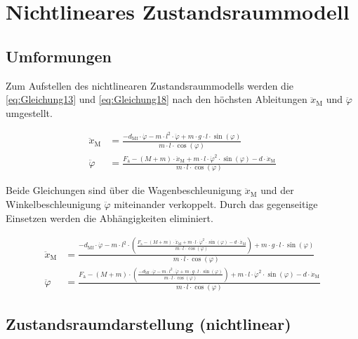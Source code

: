 \documentclass[
	pagesize,
	fontsize=12pt,
	paper=a4,
	oneside,
   reqno
]{scrartcl}
\begin{document}
\section{Nichtlineares Zustandsraummodell}

\subsection{Umformungen}

Zum Aufstellen des nichtlinearen Zustandsraummodells werden die \autoref{eq:Gleichung13} und \autoref{eq:Gleichung18} nach den höchsten Ableitungen $\ddot x_{\mathrm{M}}$ und $\ddot \varphi$ umgestellt.

\begin{align}
    \ddot x_{\mathrm{M}} &= \frac{-d_{\mathrm{Mf}} \cdot \dot \varphi -m \cdot l^2 \cdot \ddot \varphi + m \cdot g \cdot l \cdot \sin({\varphi})}{m \cdot l \cdot \cos({\varphi})} \label{eq:Gleichung19} \\
    \ddot \varphi &= \frac{F_{\mathrm{a}} - (M+m) \cdot \ddot x_{\mathrm{M}} + m \cdot l \cdot \dot \varphi^2 \cdot \sin({\varphi}) -d \cdot \dot x_{\mathrm{M}}}{m \cdot l \cdot \cos({\varphi})} \label{eq:Gleichung20}
\end{align}

Beide Gleichungen sind über die Wagenbeschleunigung $\ddot x_{\mathrm{M}}$ und der Winkelbeschleunigung $\ddot \varphi$ miteinander verkoppelt. Durch das gegenseitige Einsetzen werden die Abhängigkeiten eliminiert.

\begin{align}
    \ddot x_{\mathrm{M}} &= \frac{-d_{\mathrm{Mf}} \cdot \dot \varphi -m \cdot l^2 \cdot \left( \frac{F_{\mathrm{a}} - (M+m) \cdot \ddot x_{\mathrm{M}} + m \cdot l \cdot \dot \varphi^2 \cdot \sin({\varphi}) -d \cdot \dot x_{\mathrm{M}}}{m \cdot l \cdot \cos({\varphi})} \right) + m \cdot g \cdot l \cdot \sin({\varphi})}{m \cdot l \cdot \cos({\varphi})} \label{eq:Gleichung21} \\
    \ddot \varphi &= \frac{F_{\mathrm{a}} - (M+m) \cdot \left( \frac{-d_{\mathrm{Mf}} \cdot \dot \varphi -m \cdot l^2 \cdot \ddot \varphi + m \cdot g \cdot l \cdot \sin({\varphi})}{m \cdot l \cdot \cos({\varphi})} \right) + m \cdot l \cdot \dot \varphi^2 \cdot \sin({\varphi}) -d \cdot \dot x_{\mathrm{M}}}{m \cdot l \cdot \cos({\varphi})} \label{eq:Gleichung22}
\end{align}

\subsection{Zustandsraumdarstellung (nichtlinear)}
\end{document}
